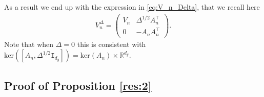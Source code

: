 \documentclass[english,13pt]{article}
\numberwithin{equation}{section}
\begin{document}
As a result we end up with the expression in \eqref{eq:V_n_Delta}, that we recall here
\begin{align*}
V_n^\Delta =
\begin{pmatrix}
V_n & \Delta^{1/2} A_n^\top \\
0 & -A_n A_n^\top
\end{pmatrix}.
\end{align*}
Note that when $\Delta=0$ this is consistent with $\text{ker}([A_n,\Delta^{1/2}\mathtt{I}_{d_y}])=\text{ker}(A_n)\times\mathbb{R}^{d_y}$.


\subsection{Proof of Proposition \ref{res:2}}\label{app:res2}

\end{document}
